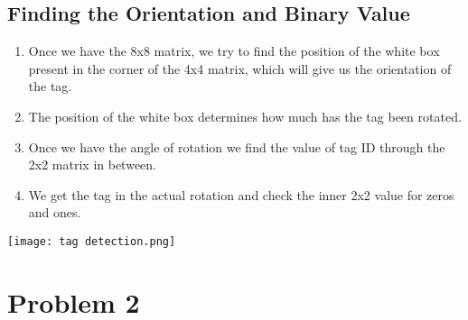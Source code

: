 \documentclass{article}
\begin{document}
\subsection{Finding the Orientation and Binary Value}
\begin{enumerate}
    \item Once we have the 8x8 matrix, we try to find the position of the white box present in the corner of the
4x4 matrix, which will give us the orientation of the tag.
    \item The position of the white box determines how much has the tag been rotated.
    \item  Once we have the angle of rotation we find the value of tag ID through the 2x2 matrix in between.
    \item  We get the tag in the actual rotation and check the inner 2x2 value for zeros and ones.
\end{enumerate}
\begin{center}

    \texttt{[image: tag detection.png]}

    
\end{center}
\section{Problem 2}
\end{document}
